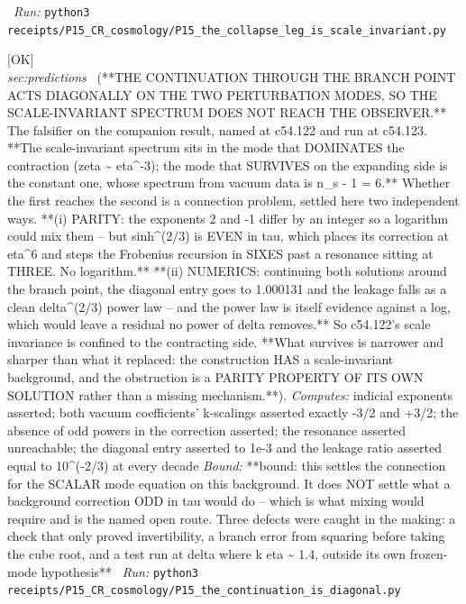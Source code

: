 \begin{description}
\ \emph{Run:} \texttt{python3 receipts/P15\_CR\_cosmology/P15\_the\_collapse\_leg\_is\_scale\_invariant.py}
\item[\label{rcpt:P15_the_continuation_is_diagonal}\texttt{P15\_the\_continuation\_is\_diagonal}]\hfill\textsf{[OK]}\\
\textit{sec:predictions} \ (**THE CONTINUATION THROUGH THE BRANCH POINT ACTS DIAGONALLY ON THE TWO PERTURBATION MODES, SO THE SCALE-INVARIANT SPECTRUM DOES NOT REACH THE OBSERVER.** The falsifier on the companion result, named at c54.122 and run at c54.123. **The scale-invariant spectrum sits in the mode that DOMINATES the contraction (zeta \textasciitilde{} eta\textasciicircum{}-3); the mode that SURVIVES on the expanding side is the constant one, whose spectrum from vacuum data is n\_s - 1 = 6.** Whether the first reaches the second is a connection problem, settled here two independent ways. **(i) PARITY: the exponents 2 and -1 differ by an integer so a logarithm could mix them -- but sinh\textasciicircum{}(2/3) is EVEN in tau, which places its correction at eta\textasciicircum{}6 and steps the Frobenius recursion in SIXES past a resonance sitting at THREE. No logarithm.** **(ii) NUMERICS: continuing both solutions around the branch point, the diagonal entry goes to 1.000131 and the leakage falls as a clean delta\textasciicircum{}(2/3) power law -- and the power law is itself evidence against a log, which would leave a residual no power of delta removes.** So c54.122's scale invariance is confined to the contracting side. **What survives is narrower and sharper than what it replaced: the construction HAS a scale-invariant background, and the obstruction is a PARITY PROPERTY OF ITS OWN SOLUTION rather than a missing mechanism.**). 
\emph{Computes:} indicial exponents asserted; both vacuum coefficients' k-scalings asserted exactly -3/2 and +3/2; the absence of odd powers in the correction asserted; the resonance asserted unreachable; the diagonal entry asserted to 1e-3 and the leakage ratio asserted equal to 10\textasciicircum{}(-2/3) at every decade
 \emph{Bound:} **bound: this settles the connection for the SCALAR mode equation on this background. It does NOT settle what a background correction ODD in tau would do -- which is what mixing would require and is the named open route. Three defects were caught in the making: a check that only proved invertibility, a branch error from squaring before taking the cube root, and a test run at delta where k eta \textasciitilde{} 1.4, outside its own frozen-mode hypothesis**
\ \emph{Run:} \texttt{python3 receipts/P15\_CR\_cosmology/P15\_the\_continuation\_is\_diagonal.py}

\end{description}
